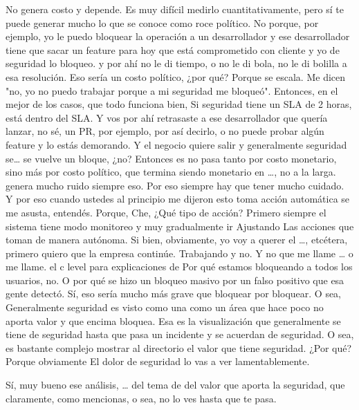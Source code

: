 \begin{description}[leftmargin=0cm, labelsep=0.5cm]
    \item[\textbf{PEÑA ALEJANDRO FRANCISCO:}] No genera costo y depende. Es muy difícil medirlo cuantitativamente, pero sí te puede generar mucho lo que se conoce como roce político. No porque, por ejemplo, yo le puedo bloquear la operación a un desarrollador y ese desarrollador tiene que sacar un feature para hoy que está comprometido con cliente y yo de seguridad lo bloqueo. y por ahí no le di tiempo, o no le di bola, no le di bolilla a esa resolución. Eso sería un costo político, ¿por qué? Porque se escala. Me dicen "no, yo no puedo trabajar porque a mi seguridad me bloqueó". Entonces, en el mejor de los casos, que todo funciona bien, Si seguridad tiene un SLA de 2 horas, está dentro del SLA. Y vos por ahí retrasaste a ese desarrollador que quería lanzar, no sé, un PR, por ejemplo, por así decirlo, o no puede probar algún feature y lo estás demorando. Y el negocio quiere salir y generalmente seguridad se… se vuelve un bloque, ¿no? Entonces es no pasa tanto por costo monetario, sino más por costo político, que termina siendo monetario en …, no a la larga. genera mucho ruido siempre eso. Por eso siempre hay que tener mucho cuidado. Y por eso cuando ustedes al principio me dijeron esto toma acción automática se me asusta, entendés. Porque, Che, ¿Qué tipo de acción? Primero siempre el sistema tiene modo monitoreo y muy gradualmente ir Ajustando Las acciones que toman de manera autónoma. Si bien, obviamente, yo voy a querer el …, etcétera, primero quiero que la empresa continúe. Trabajando y no. Y no que me llame … o me llame. el c level para explicaciones de Por qué estamos bloqueando a todos los usuarios, no. O por qué se hizo un bloqueo masivo por un falso positivo que esa gente detectó. Sí, eso sería mucho más grave que bloquear por bloquear. O sea, Generalmente seguridad es visto como una como un área que hace poco no aporta valor y que encima bloquea. Esa es la visualización que generalmente se tiene de seguridad hasta que pasa un incidente y se acuerdan de seguridad. O sea, es bastante complejo mostrar al directorio el valor que tiene seguridad. ¿Por qué? Porque obviamente El dolor de seguridad lo vas a ver lamentablemente.

    \item[\textbf{MUNTAABSKI FEDERICO:}] Sí, muy bueno ese análisis, … del tema de del valor que aporta la seguridad, que claramente, como mencionas, o sea, no lo ves hasta que te pasa.


\end{description}
